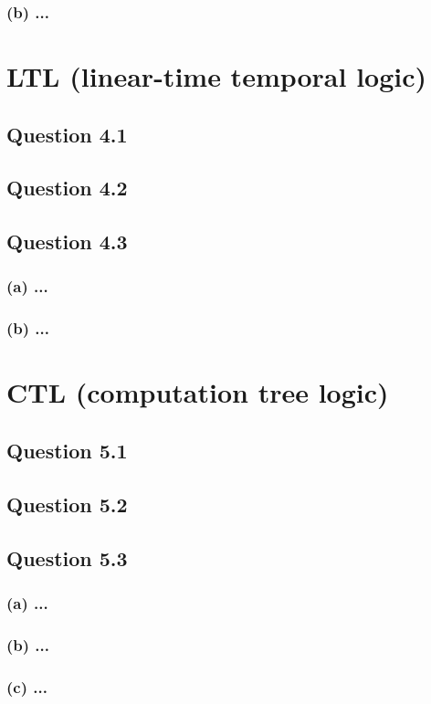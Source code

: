 \documentclass[10pt,a4paper]{article}
\begin{document}
\subsubsection*{(b) \mdseries ...}

\section{LTL (linear-time temporal logic)}
\subsection*{Question 4.1}
\subsection*{Question 4.2}
\subsection*{Question 4.3}
\subsubsection*{(a) \mdseries ...}
\subsubsection*{(b) \mdseries ...}

\section{CTL (computation tree logic)}
\subsection*{Question 5.1}
\subsection*{Question 5.2}
\subsection*{Question 5.3}
\subsubsection*{(a) \mdseries ...}
\subsubsection*{(b) \mdseries ...}
\subsubsection*{(c) \mdseries ...}
\end{document}
